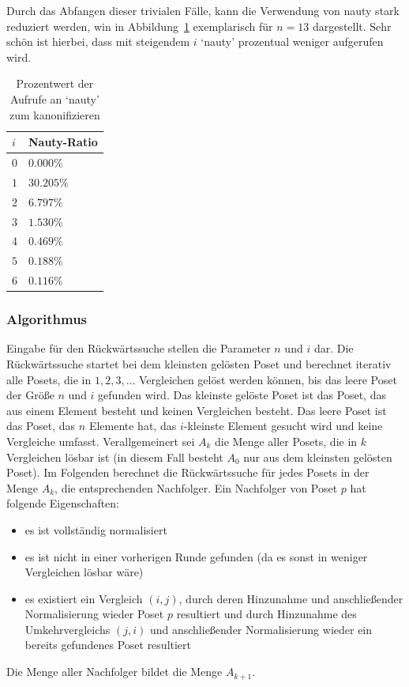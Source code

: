 \documentclass[10pt,journal,compsoc]{IEEEtran}
\begin{document}
Durch das Abfangen dieser trivialen Fälle, kann die Verwendung von nauty stark reduziert werden, win in Abbildung~\ref{table:nauty-ratio} exemplarisch für $n = 13$ dargestellt.
Sehr schön ist hierbei, dass mit steigendem $i$ `nauty' prozentual weniger aufgerufen wird.

\begin{table}
  \begin{tabular}{l|l}
    $i$ & Nauty-Ratio \\
    \hline
    $0$ & $0.000\%$   \\
    $1$ & $30.205\%$  \\
    $2$ & $6.797\%$   \\
    $3$ & $1.530\%$   \\
    $4$ & $0.469\%$   \\
    $5$ & $0.188\%$   \\
    $6$ & $0.116\%$
  \end{tabular}
  \centering
  \caption{Prozentwert der Aufrufe an `nauty' zum kanonifizieren}
  \label{table:nauty-ratio}
\end{table}

\subsubsection{Algorithmus}
Eingabe für den Rückwärtssuche stellen die Parameter $n$ und $i$ dar.
Die Rückwärtssuche startet bei dem kleinsten gelösten Poset und berechnet iterativ alle Posets, die in $1, 2, 3, \dots$ Vergleichen gelöst werden können, bis das leere Poset der Größe $n$ und $i$ gefunden wird.
Das kleinste gelöste Poset ist das Poset, das aus einem Element besteht und keinen Vergleichen besteht.
Das leere Poset ist das Poset, das $n$ Elemente hat, das $i$-kleinste Element gesucht wird und keine Vergleiche umfasst.
Verallgemeinert sei $A_k$ die Menge aller Posets, die in $k$ Vergleichen lösbar ist (in diesem Fall besteht $A_0$ nur aus dem kleinsten gelösten Poset).
Im Folgenden berechnet die Rückwärtssuche für jedes Posets in der Menge $A_k$, die entsprechenden Nachfolger.
Ein Nachfolger von Poset $p$ hat folgende Eigenschaften:
\begin{itemize}
  \item es ist vollständig normalisiert
  \item es ist nicht in einer vorherigen Runde gefunden (da es sonst in weniger Vergleichen lösbar wäre)
  \item es existiert ein Vergleich $(i, j)$, durch deren Hinzunahme und anschließender Normalisierung wieder Poset $p$ resultiert und durch Hinzunahme des Umkehrvergleichs $(j, i)$ und anschließender Normalisierung wieder ein bereits gefundenes Poset resultiert
\end{itemize}
Die Menge aller Nachfolger bildet die Menge $A_{k + 1}$.
\end{document}
